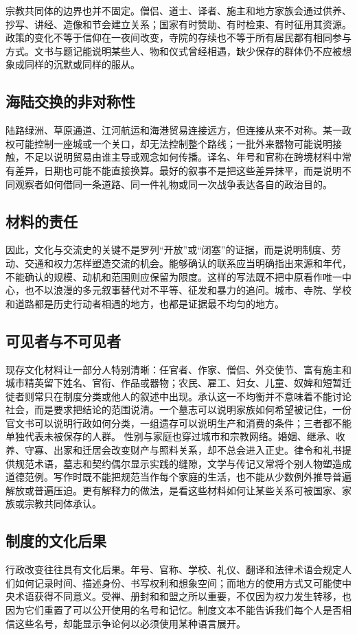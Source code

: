 宗教共同体的边界也并不固定。僧侣、道士、译者、施主和地方家族会通过供养、抄写、讲经、造像和节会建立关系；国家有时赞助、有时检束、有时征用其资源。政策的变化不等于信仰在一夜间改变，寺院的存续也不等于所有居民都有相同参与方式。文书与题记能说明某些人、物和仪式曾经相遇，缺少保存的群体仍不应被想象成同样的沉默或同样的服从。  \subsection{海陆交换的非对称性} 陆路绿洲、草原通道、江河航运和海港贸易连接远方，但连接从来不对称。某一政权可能控制一座城或一个关口，却无法控制整个路线；一批外来器物可能说明接触，不足以说明贸易由谁主导或观念如何传播。译名、年号和官称在跨境材料中常有差异，日期也可能不能直接换算。最好的叙事不是把这些差异抹平，而是说明不同观察者如何借同一条道路、同一件礼物或同一次战争表达各自的政治目的。  \subsection{材料的责任} 因此，文化与交流史的关键不是罗列“开放”或“闭塞”的证据，而是说明制度、劳动、交通和权力怎样塑造交流的机会。能够确认的联系应当明确指出来源和年代，不能确认的规模、动机和范围则应保留为限度。这样的写法既不把中原看作唯一中心，也不以浪漫的多元叙事替代对不平等、征发和暴力的追问。城市、寺院、学校和道路都是历史行动者相遇的地方，也都是证据最不均匀的地方。  \subsection{可见者与不可见者} 现存文化材料让一部分人特别清晰：任官者、作家、僧侣、外交使节、富有施主和城市精英留下姓名、官衔、作品或器物；农民、雇工、妇女、儿童、奴婢和短暂迁徙者则常只在制度分类或他人的叙述中出现。承认这一不均衡并不意味着不能讨论社会，而是要求把结论的范围说清。一个墓志可以说明家族如何希望被记住，一份官文书可以说明行政如何分类，一组遗存可以说明生产和消费的条件；三者都不能单独代表未被保存的人群。  性别与家庭也穿过城市和宗教网络。婚姻、继承、收养、守寡、出家和迁居会改变财产与照料关系，却不总会进入正史。律令和礼书提供规范术语，墓志和契约偶尔显示实践的缝隙，文学与传记又常将个别人物塑造成道德范例。写作时既不能把规范当作每个家庭的生活，也不能从少数例外推导普遍解放或普遍压迫。更有解释力的做法，是看这些材料如何让某些关系可被国家、家族或宗教共同体承认。  \subsection{制度的文化后果} 行政改变往往具有文化后果。年号、官称、学校、礼仪、翻译和法律术语会规定人们如何记录时间、描述身份、书写权利和想象空间；而地方的使用方式又可能使中央术语获得不同意义。受禅、册封和和盟之所以重要，不仅因为权力发生转移，也因为它们重置了可以公开使用的名号和记忆。制度文本不能告诉我们每个人是否相信这些名号，却能显示争论何以必须使用某种语言展开。  